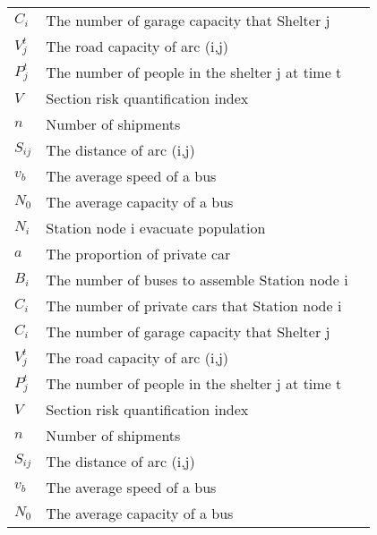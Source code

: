 \documentclass{mcmthesis}
\begin{document}
\begin{center}
\begin{longtable}{p{}p{}m{}}
$C_i$        & The number of garage capacity that Shelter j                             \\
$V_j^t$       & The road capacity of arc (i,j)                                            \\
$P_j^t$       & The number of people in the shelter j at time t                          \\
$V$       & Section risk quantification index                                         \\
$n$       & Number of shipments                                                     \\
$S_{ij}$       & The distance of arc (i,j)                                                \\
$v_b$       & The average speed of a bus                                                \\
$N_0$       & The average capacity of a bus                                             \\
$N_i$       & Station node i evacuate population                                        \\
$a$       & The proportion of private car                                           \\
$B_i$       & The number of buses to assemble Station node i                            \\
$C_i$       & The number of private cars that Station node i                            \\
$C_i$        & The number of garage capacity that Shelter j                             \\
$V_j^t$       & The road capacity of arc (i,j)                                            \\
$P_j^t$       & The number of people in the shelter j at time t                          \\
$V$       & Section risk quantification index                                         \\
$n$       & Number of shipments                                                     \\
$S_{ij}$       & The distance of arc (i,j)                                                \\
$v_b$       & The average speed of a bus                                                \\
$N_0$       & The average capacity of a bus                                             \\

\end{longtable}
\end{center}
\end{document}
